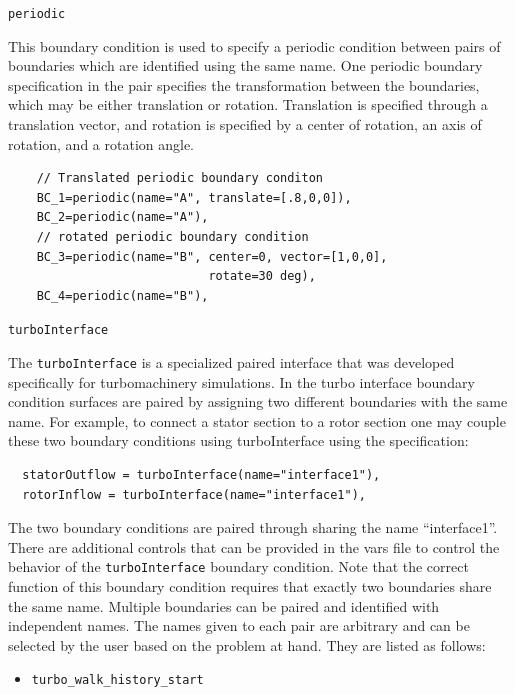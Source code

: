 \documentclass{article}
\begin{document}
\begin{list}{}{}
  \item {\tt periodic}

    This boundary condition is used to specify a periodic condition
    between pairs of boundaries which are identified using the same
    name.  One periodic boundary specification in the pair specifies the
    transformation between the boundaries, which may be either
    translation or rotation.  Translation is specified through a
    translation vector, and rotation is specified by a center of rotation,
    an axis of rotation, and a rotation angle.

\begin{verbatim}
    // Translated periodic boundary conditon
    BC_1=periodic(name="A", translate=[.8,0,0]),
    BC_2=periodic(name="A"),
    // rotated periodic boundary condition
    BC_3=periodic(name="B", center=0, vector=[1,0,0], 
                            rotate=30 deg),
    BC_4=periodic(name="B"),
\end{verbatim}

  \item {\tt turboInterface}
    
    The {\tt turboInterface} is a specialized paired interface that
    was developed specifically for turbomachinery simulations.  In the
    turbo interface boundary condition surfaces are paired by
    assigning two different boundaries with the same name.  For
    example, to connect a stator section to a rotor section one may
    couple these two boundary conditions using turboInterface using
    the specification:
\begin{verbatim}
  statorOutflow = turboInterface(name="interface1"),
  rotorInflow = turboInterface(name="interface1"),
\end{verbatim}

The two boundary conditions are paired through sharing the name
``interface1''.  There are additional controls that can be provided in
the vars file to control the behavior of the {\tt turboInterface}
boundary condition.  Note that the correct function of this boundary
condition requires that exactly two boundaries share the same name.
Multiple boundaries can be paired and identified with independent
names.  The names given to each pair are arbitrary and can be selected
by the user based on the problem at hand. They are listed as follows:

\begin{itemize}
\item {\tt turbo\_walk\_history\_start} 
  

\end{itemize}
\end{list}
\end{document}
